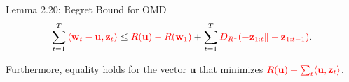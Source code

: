 \documentclass[handout]{beamer}
\begin{document}
\begin{small}
\begin{frame}{Lemma 2.20: Regret Bound for OMD}
\[
\sum_{t=1}^{T} \textcolor{mathcolor}{ \langle \mathbf{w}_t - \mathbf{u}, \mathbf{z}_t \rangle }
\leq \textcolor{mathcolor}{ R(\mathbf{u}) - R(\mathbf{w}_1) }
+ \sum_{t=1}^{T} \textcolor{mathcolor}{ D_{R^*}(-\mathbf{z}_{1:t} \| -\mathbf{z}_{1:t-1}) }.
\]

Furthermore, equality holds for the vector \( \mathbf{u} \) that minimizes \( \textcolor{mathcolor}{ R(\mathbf{u}) + \sum_t \langle \mathbf{u}, \mathbf{z}_t \rangle } \).
\end{frame}

\end{small}
\end{document}
